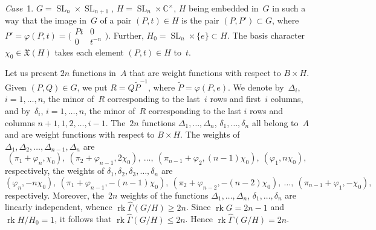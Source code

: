 \documentclass[12pt]{amsart}
\theoremstyle{definition}
\theoremstyle{remark}
\begin{document}
\textsl{Case}~1. $G={\operatorname{SL}}_n\times {\operatorname{SL}}_{n+1}$, $H={\operatorname{SL}}_n\times
\mathbb{C}^{\times}$, $H$ being embedded in~$G$ in such a way that
the image in~$G$ of a pair $(P,t)\in H$ is the pair $(P,P')\subset
G$, where $P'=\varphi(P,t)=\bigl(\begin{smallmatrix} Pt & 0 \\ 0 &
t^{-n}
\end{smallmatrix}\bigr)$. Further, $H_0={\operatorname{SL}}_n\times\{e\}\subset H$.
The basis character $\chi_0\in\mathfrak{X}(H)$ takes each element
$(P,t)\in H$ to~$t$.

Let us present $2n$ functions in~$A$ that are weight functions with
respect to $B\times H$. Given $(P,Q)\in G$, we put $R=Q\widetilde
P^{-1}$, where $\widetilde P=\varphi(P,e)$. We denote by~$\Delta_i$,
$i=1,\dots,n$, the minor of~$R$ corresponding to the last~$i$ rows
and first~$i$ columns, and by~$\delta_i$, $i=1,\dots,n$, the minor
of~$R$ corresponding to the last $i$ rows and columns
$n+1,1,2,\dots,i-1$. The~$2n$ functions $\Delta_1,\dots,\Delta_n$,
$\delta_1,\dots,\delta_n$ all belong to~$A$ and are weight functions
with respect to $B\times H$. The weights of
$\Delta_1,\Delta_2,\dots,\Delta_{n-1},\Delta_n$ are
$$
(\pi_1+\varphi_n,\chi_0),\ (\pi_2+\varphi_{n-1},2\chi_0),\ \dots,\
(\pi_{n-1}+\varphi_2,(n-1)\chi_0),\ (\varphi_1,n\chi_0),
$$
respectively, the weights of
$\delta_1,\delta_2,\delta_3,\dots,\delta_n$ are
$$
(\varphi_n,-n\chi_0),\ (\pi_1+\varphi_{n-1},-(n-1)\chi_0),\
(\pi_2+\varphi_{n-2},-(n-2)\chi_0),\ \dots,\
(\pi_{n-1}+\varphi_1,-\chi_0),
$$
respectively. Moreover, the~$2n$ weights of the functions
$\Delta_1,\dots,\Delta_n$, $\delta_1,\dots,\delta_n$ are linearly
independent, whence ${\operatorname{rk}}\widehat\Gamma(G/H){\geqslant}2n$. Since ${\operatorname{rk}}
G=2n-1$ and ${\operatorname{rk}} H/H_0=1$, it follows that ${\operatorname{rk}}\widehat\Gamma(G/H)
{\leqslant} 2n$. Hence ${\operatorname{rk}}\widehat\Gamma(G/H)=2n$.
\end{document}
